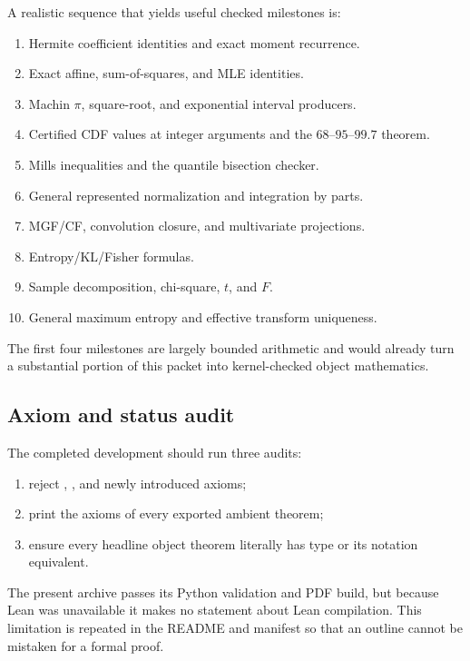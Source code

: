 A realistic sequence that yields useful checked milestones is:
\begin{enumerate}
  \item Hermite coefficient identities and exact moment recurrence.
  \item Exact affine, sum-of-squares, and MLE identities.
  \item Machin $\pi$, square-root, and exponential interval producers.
  \item Certified CDF values at integer arguments and the $68$--$95$--$99.7$ theorem.
  \item Mills inequalities and the quantile bisection checker.
  \item General represented normalization and integration by parts.
  \item MGF/CF, convolution closure, and multivariate projections.
  \item Entropy/KL/Fisher formulas.
  \item Sample decomposition, chi-square, $t$, and $F$.
  \item General maximum entropy and effective transform uniqueness.
\end{enumerate}
The first four milestones are largely bounded arithmetic and would already turn a substantial portion of this packet into kernel-checked object mathematics.

\subsection{Axiom and status audit}

The completed development should run three audits:
\begin{enumerate}[label=(\roman*)]
  \item reject , , and newly introduced axioms;
  \item print the axioms of every exported ambient theorem;
  \item ensure every headline object theorem literally has type  or its notation equivalent.
\end{enumerate}
The present archive passes its Python validation and PDF build, but because Lean was unavailable it makes no statement about Lean compilation.  This limitation is repeated in the README and manifest so that an outline cannot be mistaken for a formal proof.
